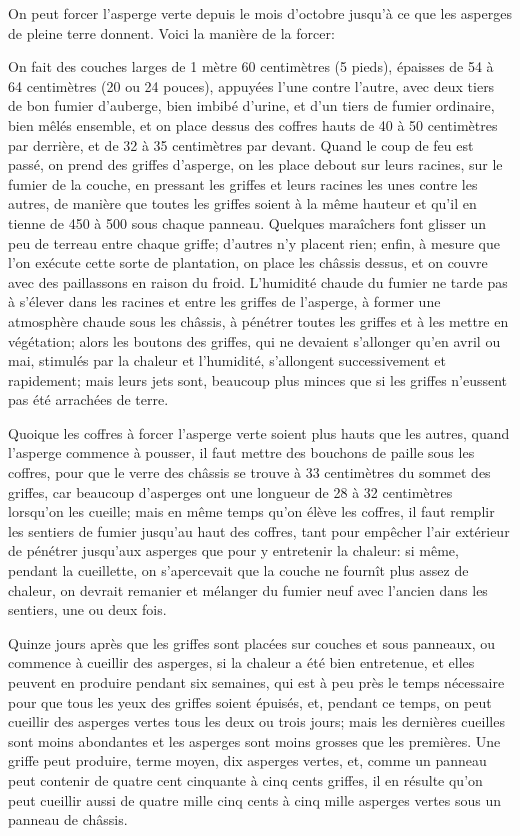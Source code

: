 \documentclass[10pt,a4paper]{book}
\begin{document}
On peut forcer l'asperge verte depuis le mois d'octobre jusqu'à ce que les asperges de pleine terre donnent. Voici la manière de la forcer:

On fait des couches larges de 1 mètre 60 centimètres (5 pieds), épaisses de 54 à 64 centimètres (20 ou 24 pouces), appuyées l'une contre l'autre, avec deux tiers de bon fumier d'auberge, bien imbibé d'urine, et d'un tiers de fumier ordinaire, bien mêlés ensemble, et on place dessus des coffres hauts de 40 à 50 centimètres par derrière, et de 32 à 35 centimètres par devant. Quand le coup de feu est passé, on prend des griffes d'asperge, on les place debout sur leurs racines, sur le fumier de la couche, en pressant les griffes et leurs racines les unes contre les autres, de manière que toutes les griffes soient à la même hauteur et qu'il en tienne de 450 à 500 sous chaque panneau. Quelques maraîchers font glisser un peu de terreau entre chaque griffe; d'autres n'y placent rien; enfin, à mesure que l'on exécute cette sorte de plantation, on place les châssis dessus, et on couvre avec des paillassons en raison du froid. L'humidité chaude du fumier ne tarde pas à s'élever dans les racines et entre les griffes de l'asperge, à former une atmosphère chaude sous les châssis, à pénétrer toutes les griffes et à les mettre en végétation; alors les boutons des griffes, qui ne devaient s'allonger qu'en avril ou mai, stimulés par la chaleur et l'humidité, s'allongent successivement et rapidement; mais leurs jets sont, beaucoup plus minces que si les griffes n'eussent pas été arrachées de terre.

Quoique les coffres à forcer l'asperge verte soient plus hauts que les autres, quand l'asperge commence à pousser, il faut mettre des bouchons de paille sous les coffres, pour que le verre des châssis se trouve à 33 centimètres du sommet des griffes, car beaucoup d'asperges ont une longueur de 28 à 32 centimètres lorsqu'on les cueille; mais en même temps qu'on élève les coffres, il faut remplir les sentiers de fumier jusqu'au haut des coffres, tant pour empêcher l'air extérieur de pénétrer jusqu'aux asperges que pour y entretenir la chaleur: si même, pendant la cueillette, on s'apercevait que la couche ne fournît plus assez de chaleur, on devrait remanier et mélanger du fumier neuf avec l'ancien dans les sentiers, une ou deux fois.

Quinze jours après que les griffes sont placées sur couches et sous panneaux, ou commence à cueillir des asperges, si la chaleur a été bien entretenue, et elles peuvent en produire pendant six semaines, qui est à peu près le temps nécessaire pour que tous les yeux des griffes soient épuisés, et, pendant ce temps, on peut cueillir des asperges vertes tous les deux ou trois jours; mais les dernières cueilles sont moins abondantes et les asperges sont moins grosses que les premières. Une griffe peut produire, terme moyen, dix asperges vertes, et, comme un panneau peut contenir de quatre cent cinquante à cinq cents griffes, il en résulte qu'on peut cueillir aussi de quatre mille cinq cents à cinq mille asperges vertes sous un panneau de châssis.
\end{document}
